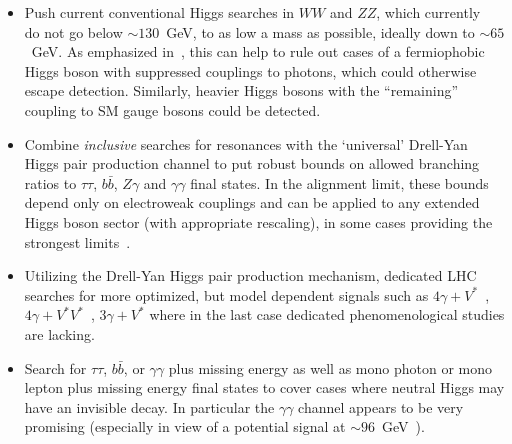 \documentclass[../report.tex]{subfiles}
\providecommand{\main}{..}
\begin{document}
\begin{itemize}
\item Push current conventional Higgs searches in $WW$ and $ZZ$, which
  currently~\cite{Khachatryan:2015cwa,Sirunyan:2018qlb} do not go below
  $\sim 130$~GeV, to as low a mass as possible, ideally down to $\sim
  65$~GeV. As emphasized in~\cite{Delgado:2016arn,Vega:2018ddp}, this
  can help to rule out cases of a fermiophobic Higgs boson with
  suppressed couplings to photons, which could otherwise escape
  detection. Similarly, heavier Higgs bosons with the ``remaining''
  coupling to SM gauge bosons could be detected.

\item Combine \emph{inclusive} searches for resonances with the
  `universal' Drell-Yan Higgs pair production channel to put robust
  bounds on allowed branching ratios to $\tau\tau$, $b\bar{b}$, $Z\gamma$ and
  $\gamma\gamma$ final states. In the alignment limit,
  these bounds depend only on electroweak couplings and can be applied
  to any extended Higgs boson sector (with appropriate rescaling), in
  some cases providing the strongest limits~\cite{Delgado:2016arn,Vega:2018ddp}.

\item Utilizing the Drell-Yan Higgs pair production mechanism, dedicated
  LHC searches for more optimized, but model dependent signals such as
  $4\gamma + V^\ast$~\cite{Akeroyd:2003bt,Aaltonen:2016fnw,Arhrib:2017wmo},
  $4\gamma + V^\ast V^\ast$~\cite{Akeroyd:2003bt}, $3\gamma +
  V^\ast$ where in the last case dedicated phenomenological studies are
  lacking. 

\item Search for $\tau\tau$, $b\bar{b}$, or $\gamma\gamma$ plus missing
  energy as well as mono photon or mono lepton plus missing energy final
  states to cover cases where neutral Higgs may have an invisible
  decay. In particular the $\gamma\gamma$ channel appears to be
  very promising (especially in view of a potential signal at 
  $\sim 96$~GeV~\cite{CMS-PAS-HIG-17-013}).
 
\end{itemize}






%
\end{document}
